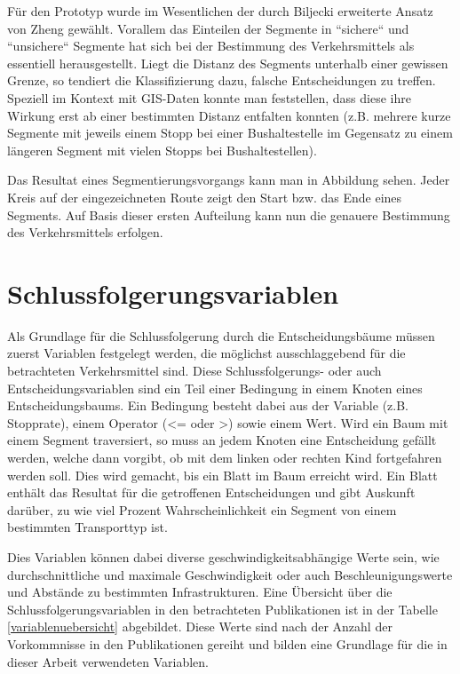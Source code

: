 Für den Prototyp wurde im Wesentlichen der durch Biljecki erweiterte Ansatz von Zheng gewählt. Vorallem das Einteilen der Segmente in ``sichere`` und ``unsichere`` Segmente hat sich bei der Bestimmung des Verkehrsmittels als essentiell herausgestellt. Liegt die Distanz  des Segments unterhalb einer gewissen Grenze, so tendiert die Klassifizierung dazu, falsche Entscheidungen zu treffen. Speziell im Kontext mit  GIS-Daten konnte man feststellen, dass diese ihre Wirkung erst ab einer bestimmten Distanz entfalten konnten (z.B. mehrere kurze Segmente mit jeweils einem Stopp bei einer Bushaltestelle im Gegensatz zu einem längeren Segment mit vielen Stopps bei Bushaltestellen).

 Das Resultat eines Segmentierungsvorgangs kann man in Abbildung  sehen. Jeder Kreis auf der eingezeichneten Route zeigt den Start bzw. das Ende eines Segments. Auf Basis dieser ersten Aufteilung kann nun die genauere Bestimmung des Verkehrsmittels erfolgen.

\clearpage

\section{Schlussfolgerungsvariablen}
\label{schlussfolgerungsvariablen}

Als Grundlage für die Schlussfolgerung durch die Entscheidungsbäume müssen zuerst Variablen festgelegt werden, die möglichst ausschlaggebend für die betrachteten Verkehrsmittel sind. Diese Schlussfolgerungs- oder auch Entscheidungsvariablen sind ein Teil einer Bedingung in einem Knoten eines Entscheidungsbaums. Ein Bedingung besteht dabei aus der Variable (z.B. Stopprate), einem Operator (<= oder >) sowie einem Wert. Wird ein Baum mit einem Segment traversiert, so muss an jedem Knoten eine Entscheidung gefällt werden, welche dann vorgibt, ob mit dem linken oder rechten Kind fortgefahren werden soll. Dies wird gemacht, bis ein Blatt im Baum erreicht wird. Ein Blatt enthält das Resultat für die  getroffenen Entscheidungen und gibt Auskunft darüber, zu wie viel Prozent Wahrscheinlichkeit ein Segment von einem bestimmten Transporttyp ist.

Dies Variablen können dabei diverse geschwindigkeitsabhängige Werte sein, wie durchschnittliche und maximale Geschwindigkeit oder auch Beschleunigungswerte und  Abstände zu bestimmten Infrastrukturen. Eine Übersicht über die Schlussfolgerungsvariablen in den betrachteten Publikationen ist in der Tabelle \ref{variablenuebersicht} abgebildet. Diese Werte sind nach der Anzahl der Vorkommnisse in den Publikationen gereiht und bilden eine Grundlage für die in dieser Arbeit verwendeten Variablen. 

